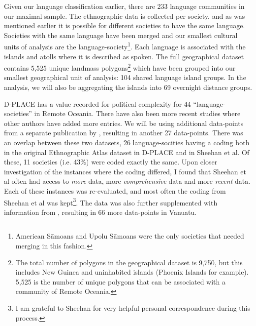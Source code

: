 \documentclass[12pt,letterpaper]{article}
\begin{document}
Given our language classification earlier, there are 233 language communities in our maximal sample. The ethnographic data is collected per society, and as was mentioned earlier it is possible for different societies to have the same language. Societies with the same language have been merged and our smallest cultural units of analysis are the language-society\footnote{American S\={a}moans and Upolu S\={a}moans were the only societies that needed merging in this fashion.}. Each language is associated with the islands and atolls where it is described as spoken. The full geographical dataset contains 5,525 unique landmass polygons\footnote{The total number of polygons in the geographical dataset is 9,750, but this includes New Guinea and uninhabited islands (Phoenix Islands for example). 5,525 is the number of unique polygons that can be associated with a community of Remote Oceania.} which have been grouped into our smallest geographical unit of analysis: 104 shared language island groups. In the analysis, we will also be aggregating the islands into 69 overnight distance groups.

D-PLACE has a value recorded for political complexity for 44 ``language-societies'' in Remote Oceania. There have also been more recent studies where other authors have added more entries. We will be using additional data-points from a separate publication by \citet{sheehan2018coevolution}, resulting in another 27 data-points. There was an overlap between these two datasets, 26 language-socities having a coding both in the original Ethnographic Atlas dataset in D-PLACE and in Sheehan et al. Of these, 11 societies (i.e. 43\%) were coded exactly the same. Upon closer investigation of the instances where the coding differed, I found that Sheehan et al often had access to \textit{more} data, more \textit{comprehensive} data and more \textit{recent} data. Each of these instances was re-evaluated, and most often the coding from Sheehan et al was kept\footnote{I am grateful to Sheehan for very helpful personal correspondence during this process.}. The data was also further supplemented with information from \citet[201]{bonnemaison1996graded}, resulting in 66 more data-points in Vanuatu. 



\end{document}
